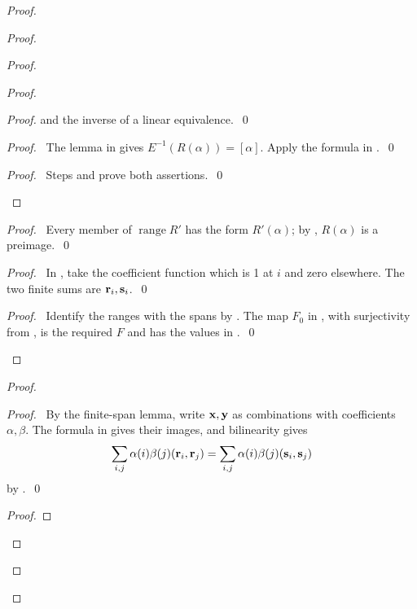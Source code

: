 \begin{proof}
\begin{proof}
\begin{proof}
\begin{proof}
\begin{proof}
     and the inverse of a linear equivalence.~\qed\end{proof}
    \begin{proof}
     \pf\ The lemma  in
      gives $E^{-1}(R(\alpha))=[\alpha]$.
     Apply the formula in .~\qed
    \end{proof}
    \qedstep
    \begin{proof}\pf\ Steps  and 
     prove both assertions.~\qed\end{proof}
   \end{proof}
   \begin{proof}\pf\ Every member of $\operatorname{range}R'$ has the form $R'(\alpha)$;
    by , $R(\alpha)$ is a preimage.~\qed\end{proof}
   \begin{proof}
    \pf\ In , take the coefficient function which is 1 at $i$
    and zero elsewhere. The two finite sums are ${\mathbf r}_i,{\mathbf s}_i$.~\qed
   \end{proof}
   \qedstep
   \begin{proof}\pf\ Identify the ranges with the spans by .
    The map $F_0$ in , with surjectivity from
    , is the required $F$ and has the values in
    .~\qed\end{proof}
  \end{proof}
  \begin{proof}
   \begin{proof}
    \pf\ By the finite-span lemma, write ${\mathbf x},{\mathbf y}$ as combinations with coefficients
    $\alpha,\beta$. The formula in  gives their images, and bilinearity gives
    \[
     \sum_{i,j}\alpha(i)\beta(j)({\mathbf r}_i,{\mathbf r}_j)
       =\sum_{i,j}\alpha(i)\beta(j)({\mathbf s}_i,{\mathbf s}_j)
    \]
    by .~\qed
   \end{proof}
   \begin{proof}

\end{proof}
\end{proof}
\end{proof}
\end{proof}
